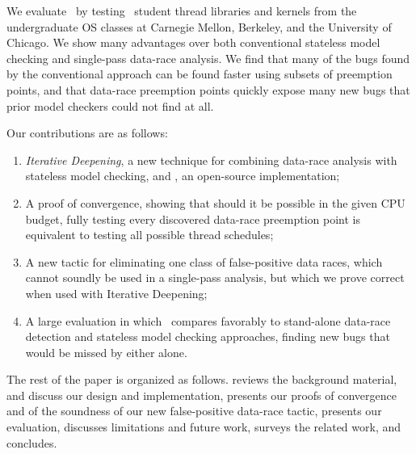 We evaluate \quicksand~by testing \numstudence~student thread libraries and kernels from the undergraduate OS classes at Carnegie Mellon, Berkeley, and the University of Chicago.
We show many advantages over both conventional stateless model checking and single-pass data-race analysis.
We find that many of the bugs found by the conventional approach can be found faster using subsets of preemption points,
and that data-race preemption points quickly expose many new bugs that prior model checkers could not find at all.

Our contributions are as follows:
\begin{enumerate}
	\item {\em Iterative Deepening}, a new technique for combining data-race analysis with stateless model checking, and \quicksand, an open-source implementation;
	\item A proof of convergence, showing that should it be possible in the given CPU budget,
		fully testing every discovered data-race preemption point is equivalent to testing all possible thread schedules;
	\item A new tactic for eliminating one class of false-positive data races,
		which cannot soundly be used in a single-pass analysis,
		but which we prove correct when used with Iterative Deepening;
	\item A large evaluation in which \quicksand~compares favorably to stand-alone data-race detection and stateless model checking approaches, finding new bugs that would be missed by either alone.
\end{enumerate}

The rest of the paper is organized as follows.
\sect{\ref{sec:overview}} reviews the background material, %
\sect{\ref{sec:design}} and \sect{\ref{sec:implementation}} discuss our design and implementation, %
\sect{\ref{sec:soundness}} presents our proofs of convergence and of the soundness of our new false-positive data-race tactic,
\sect{\ref{sec:eval}} presents our evaluation,
\sect{\ref{sec:future}} discusses limitations and future work,
\sect{\ref{sec:related}} surveys the related work,
and \sect{\ref{sec:conclusion}} concludes.

